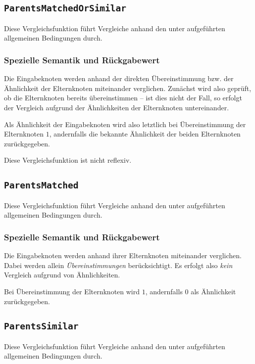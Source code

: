 %
%
\subsection{\texttt{ParentsMatchedOrSimilar}}
Diese Vergleichsfunktion führt Vergleiche anhand den unter  aufgeführten allgemeinen Bedingungen durch.

\subsubsection*{Spezielle Semantik und Rückgabewert}
Die Eingabeknoten werden anhand der direkten Übereinstimmung bzw. der Ähnlichkeit der Elternknoten miteinander verglichen. Zunächst wird also geprüft, ob die Elternknoten bereits übereinstimmen -- ist dies nicht der Fall, so erfolgt der Vergleich aufgrund der Ähnlichkeiten der Elternknoten untereinander.

Als Ähnlichkeit der Eingabeknoten wird also letztlich bei Übereinstimmung der Elternknoten $1$, andernfalls die bekannte Ähnlichkeit der beiden Elternknoten zurückgegeben.

 Diese Vergleichsfunktion ist nicht reflexiv.


%
%
\subsection{\texttt{ParentsMatched}}
Diese Vergleichsfunktion führt Vergleiche anhand den unter  aufgeführten allgemeinen Bedingungen durch.

\subsubsection*{Spezielle Semantik und Rückgabewert}
Die Eingabeknoten werden anhand ihrer Elternknoten miteinander verglichen. Dabei werden allein \emph{Übereinstimmungen} berücksichtigt. Es erfolgt also \emph{kein} Vergleich aufgrund von Ähnlichkeiten.

Bei Übereinstimmung der Elternknoten wird $1$, andernfalls $0$ als Ähnlichkeit zurückgegeben.


\newpage
%
%
\subsection{\texttt{ParentsSimilar}}
Diese Vergleichsfunktion führt Vergleiche anhand den unter  aufgeführten allgemeinen Bedingungen durch.

